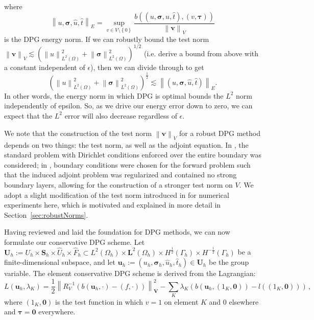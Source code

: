 \documentclass[letterpaper]{article}
\def\btau{\boldsymbol\tau}
\def\bftau{\boldsymbol\tau}
\def\bfsigma{\boldsymbol\sigma}
\newcommand{\bs}[1]{\boldsymbol{#1}}
\newcommand{\secref}[1]{\ref{sec:#1}}
\newcommand{\norm}[1]{\left\| #1 \right\|}
\newcommand{\LRp}[1]{\left( #1 \right)}
\newcommand{\LRc}[1]{\left\{ #1 \right\}}
\newcommand{\uh}{\widehat{u}}
\renewcommand{\L}{L^2\LRp{\Omega}}
\newcommand{\bfv}{\boldsymbol v}
\begin{document}
where
\[
\norm{u,\bfsigma,\uh,\hat t}_E = \sup_{v\in
V\setminus\LRc{0}}\frac{b\LRp{\LRp{u,\bfsigma,\uh,\hat t},\LRp{v,\bftau}}}{\norm{\bfv}_V}
\]
is the DPG energy norm.  If we can robustly bound the test norm $\norm{\bfv}_V
\lesssim \LRp{\norm{u}_{\L}^2+\norm{\bfsigma}^2_{\L}}^{1/2}$ (i.e. derive a
bound from above with a constant independent of $\epsilon$), then we can
divide through to get
\begin{equation}
\LRp{\norm{u}_{\L}^2 + \norm{\bfsigma}_{\L}^2}^{\frac{1}{2}} \lesssim
\norm{(u,\bfsigma,\uh,\hat t)}_E.
\label{eq:robustBound}
\end{equation}
In other words, the energy norm in which DPG 
is optimal bounds the $L^2$ norm independently of epsilon.  So, as
we drive our energy error down to zero, we
can expect that the $L^2$ error will also decrease regardless of $\epsilon$.

We note that the construction of the test norm $\norm{\bfv}_V$ for a robust DPG
method depends on two things: the test norm, as well as the adjoint equation.
In \cite{DemkowiczHeuer}, the standard problem with Dirichlet conditions
enforced over the entire boundary was considered; in
\cite{ChanHeuerThanhDemkowicz2012}, boundary conditions were chosen for the
forward problem such that the induced adjoint problem was regularized and
contained no strong boundary layers, allowing for the construction of a
stronger test norm on $V$.  We adopt a slight modification of the test norm
introduced in \cite{ChanHeuerThanhDemkowicz2012} for numerical experiments
here, which is motivated and explained in more detail in
Section~\secref{robustNorms}.


Having reviewed and laid the foundation for DPG methods, we can now formulate our conservative DPG scheme.  %
Let $\bs U_h:=U_h\times\bs S_h\times\hat U_h\times\hat F_h\subset L^2(\Omega_h)\times\bs
L^2(\Omega_h)\times H^{\frac{1}{2}}(\Gamma_h)\times H^{-\frac{1}{2}}(\Gamma_h)$
be a finite-dimensional subspace, and let 
$\bs u_h:=(u_h,\bfsigma_h,\hat u_h,\hat t_h)\in\bs U_h$ 
be the group variable. The element conservative DPG scheme is
derived from the Lagrangian:
\begin{equation}
L(\bs u_h,\lambda_K)=\frac{1}{2}\norm{R_V^{-1}(b(\bs
u_h,\cdot)-(f,\cdot))}^2_{\bs V}-\sum_K\lambda_K(b(\bs u_h,(1_K,\bs0))-l((1_K,\bs0)))\,,
\label{eq:lagrangian}
\end{equation}
where $(1_K,\bs0)$ is the test function in which $v=1$ on element $K$ and 0 elsewhere and $\btau=\bs0$ everywhere.
\end{document}

